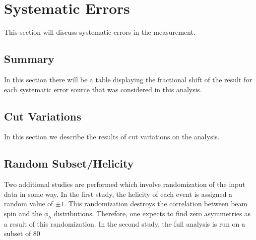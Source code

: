 \section{Systematic Errors}
This section will discuss systematic errors in the measurement.
\\


\subsection{Summary}
In this section there will be a table displaying the fractional shift of the result for each systematic error source that was considered in this analysis.  

\subsection{Cut Variations}
In this section we describe the results of cut variations on the analysis. 

\subsection{Random Subset/Helicity}

Two additional studies are performed which involve randomization of the input data in some way.  In the first study, the helicity of each event is assigned a random value of $\pm 1$.  This randomization destroys the correlation between beam spin and the $\phi_h$ distributions.  Therefore, one expects to find zero asymmetries as a result of this randomization.  In the second study, the full analysis is run on a subset of 80%
\\

